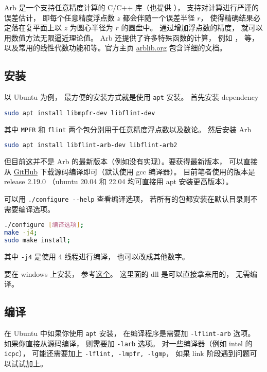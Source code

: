 


Arb 是一个支持任意精度计算的 C/C++ 库（也提供 ）， 支持对计算进行严谨的误差估计， 即每个任意精度浮点数 $z$ 都会伴随一个误差半径 $r$， 使得精确结果必定落在复平面上以 $z$ 为圆心半径为 $r$ 的圆盘中。 通过增加浮点数的精度， 就可以用数值方法无限逼近理论值。 Arb 还提供了许多特殊函数的计算， 例如 ，  等，以及常用的线性代数功能和等。官方主页 \href{https://arblib.org/}{arblib.org} 包含详细的文档。

\subsection{安装}
以 Ubuntu 为例， 最方便的安装方式就是使用 \verb`apt` 安装。 首先安装 dependency
\begin{lstlisting}[language=bash]
sudo apt install libmpfr-dev libflint-dev
\end{lstlisting}
其中 \verb`MPFR` 和 \verb`flint` 两个包分别用于任意精度浮点数以及数论。 然后安装 Arb
\begin{lstlisting}[language=bash]
sudo apt install libflint-arb-dev libflint-arb2
\end{lstlisting}

但目前这并不是 Arb 的最新版本（例如没有实现）。要获得最新版本， 可以直接从 \href{https://github.com/fredrik-johansson/arb/}{GitHub} 下载源码编译即可（默认使用 gcc 编译器）。 目前笔者使用的版本是 release 2.19.0 （ubuntu 20.04 和 22.04 均可直接用 apt 安装更高版本）。

可以用 \verb`./configure --help` 查看编译选项， 若所有的包都安装在默认目录则不需要编译选项。
\begin{lstlisting}[language=bash]
./configure [编译选项];
make -j4;
sudo make install;
\end{lstlisting}
其中 \verb`-j4` 是使用 4 线程进行编译， 也可以改成其他数字。

要在 windows 上安装， 参考\href{https://github.com/ahrvoje/arb4win}{这个}。 这里面的 dll 是可以直接拿来用的， 无需编译。

\subsection{编译}
在 Ubuntu 中如果你使用 \verb`apt` 安装， 在编译程序是需要加 \verb`-lflint-arb` 选项。 如果你直接从源码编译， 则需要加 \verb`-larb` 选项。 对一些编译器（例如 intel 的 \verb`icpc`）， 可能还需要加上 \verb`-lflint, -lmpfr, -lgmp`， 如果 link 阶段遇到问题可以试试加上。

